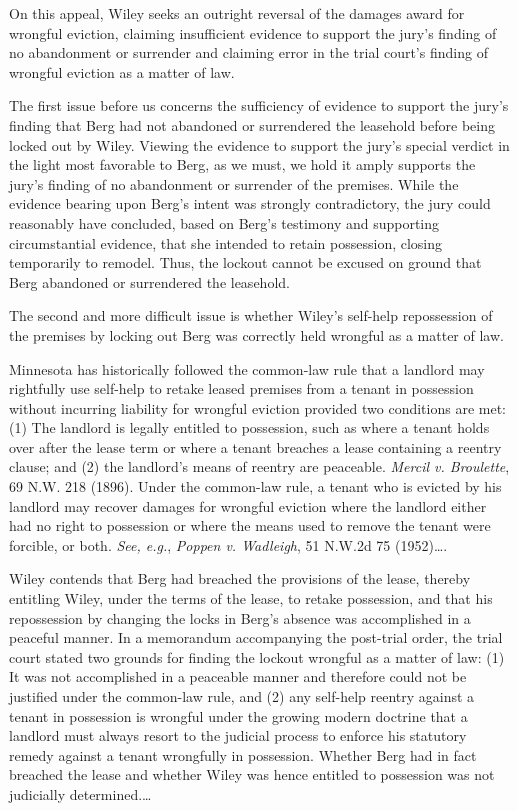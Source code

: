 On this appeal, Wiley seeks an outright reversal of the
damages award for wrongful eviction, claiming insufficient evidence to support
the jury's finding of no abandonment or surrender and claiming error in the
trial court's finding of wrongful eviction as a matter of law.

The first issue before us concerns the sufficiency of evidence to support the
jury's finding that Berg had not abandoned or
surrendered the leasehold before being locked out by
Wiley. Viewing the evidence to support the jury's
special verdict in the light most favorable to Berg, as
we must, we hold it amply supports the jury's finding of no
abandonment or surrender of the premises. While the evidence bearing upon
Berg's intent was strongly contradictory, the jury
could reasonably have concluded, based on Berg's
testimony and supporting circumstantial evidence, that she intended to retain
possession, closing temporarily to remodel. Thus, the lockout cannot be excused
on ground that Berg abandoned or surrendered the
leasehold.

The second and more difficult issue is whether Wiley's
self-help repossession of the premises by locking out
Berg was correctly held wrongful as a matter of law.

Minnesota has historically followed the common-law rule that a landlord may
rightfully use self-help to retake leased premises from a tenant in possession
without incurring liability for wrongful eviction provided two conditions are
met: (1) The landlord is legally entitled to possession, such as where a tenant
holds over after the lease term or where a tenant breaches a lease containing a
reentry clause; and (2) the landlord's means of reentry are peaceable.
\textit{Mercil v. Broulette}, 69 N.W. 218 (1896). Under the common-law rule, a
tenant who is evicted by his landlord may recover damages for wrongful eviction
where the landlord either had no right to possession or where the means used to
remove the tenant were forcible, or both. \textit{See, e.g.}, \textit{Poppen
v. Wadleigh}, 51 N.W.2d 75 (1952)\ldots. 

Wiley contends that Berg had
breached the provisions of the lease, thereby entitling
Wiley, under the terms of the lease, to retake
possession, and that his repossession by changing the locks in
Berg's absence was accomplished in a peaceful manner.
In a memorandum accompanying the post-trial order, the trial court stated two
grounds for finding the lockout wrongful as a matter of law: (1) It was not
accomplished in a peaceable manner and therefore could not be justified under
the common-law rule, and (2) any self-help reentry against a tenant in
possession is wrongful under the growing modern doctrine that a landlord must
always resort to the judicial process to enforce his statutory remedy against a
tenant wrongfully in possession. Whether Berg had in
fact breached the lease and whether Wiley was hence
entitled to possession was not judicially determined.\ldots 

